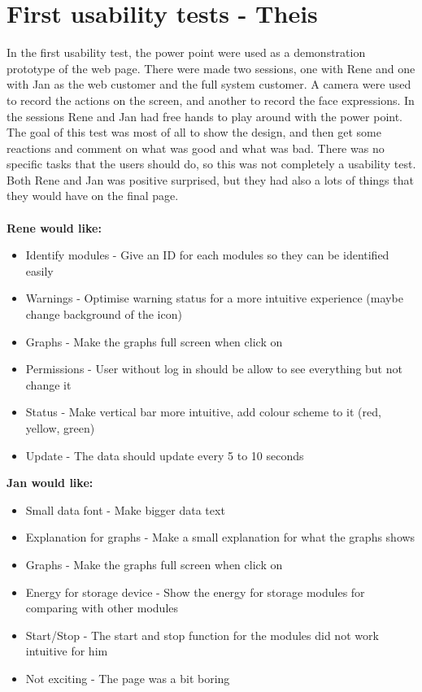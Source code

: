 \section{First usability tests - Theis}
In the first usability test, the power point were used as a demonstration prototype of the web page. There were made two sessions, one with Rene and one with Jan as the web customer and the full system customer. A camera were used to record the actions on the screen, and another to record the face expressions. In the sessions Rene and Jan had free hands to play around with the power point. The goal of this test was most of all to show the design, and then get some reactions and comment on what was good and what was bad. There was no specific tasks that the users should do, so this was not completely a usability test. Both Rene and Jan was positive surprised, but they had also a lots of things that they would have on the final page.\\\\
\textbf{Rene would like:}
\begin{itemize}
	\item Identify modules - Give an ID for each modules so they can be identified easily
	\item Warnings - Optimise warning status for a more intuitive experience (maybe change background of the icon)
	\item Graphs - Make the graphs full screen when click on
	\item Permissions - User without log in should be allow to see everything but not change it
	\item Status - Make vertical bar more intuitive, add colour scheme to it (red, yellow, green)
	\item Update - The data should update every 5 to 10 seconds
\end{itemize}
\textbf{Jan would like:}
\begin{itemize}
	\item Small data font - Make bigger data text
	\item Explanation for graphs - Make a small explanation for what the graphs shows
	\item Graphs - Make the graphs full screen when click on
	\item Energy for storage device - Show the energy for storage modules for comparing with other modules
	\item Start/Stop - The start and stop function for the modules did not work intuitive for him
	\item Not exciting - The page was a bit boring
\end{itemize}
